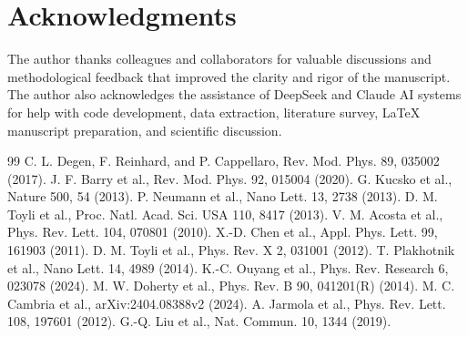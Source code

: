 \documentclass[12pt]{article}
\begin{document}
\section*{Acknowledgments}
The author thanks colleagues and collaborators for valuable discussions and methodological feedback that improved the clarity and rigor of the manuscript. The author also acknowledges the assistance of DeepSeek and Claude AI systems for help with code development, data extraction, literature survey, LaTeX manuscript preparation, and scientific discussion.


\begin{thebibliography}{99}
 C. L. Degen, F. Reinhard, and P. Cappellaro, Rev. Mod. Phys. 89, 035002 (2017).
 J. F. Barry et al., Rev. Mod. Phys. 92, 015004 (2020).
 G. Kucsko et al., Nature 500, 54 (2013).
 P. Neumann et al., Nano Lett. 13, 2738 (2013).
 D. M. Toyli et al., Proc. Natl. Acad. Sci. USA 110, 8417 (2013).
 V. M. Acosta et al., Phys. Rev. Lett. 104, 070801 (2010).
 X.-D. Chen et al., Appl. Phys. Lett. 99, 161903 (2011).
 D. M. Toyli et al., Phys. Rev. X 2, 031001 (2012).
 T. Plakhotnik et al., Nano Lett. 14, 4989 (2014).
 K.-C. Ouyang et al., Phys. Rev. Research 6, 023078 (2024).
 M. W. Doherty et al., Phys. Rev. B 90, 041201(R) (2014).
 M. C. Cambria et al., arXiv:2404.08388v2 (2024).
 A. Jarmola et al., Phys. Rev. Lett. 108, 197601 (2012).
 G.-Q. Liu et al., Nat. Commun. 10, 1344 (2019).
\end{thebibliography}
\end{document}
